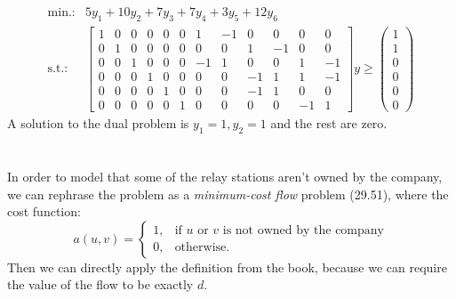 \documentclass{article}
\begin{document}
\[
\begin{array}{cl}
\textrm{min.:} & 5y_1 + 10y_2 + 7y_3 + 7y_4 + 3y_5 + 12y_6\\
\textrm{s.t.:} &
 \begin{bmatrix}%
 1 & 0 & 0 & 0 & 0 & 0 & 1 & -1 & 0 & 0 & 0 & 0\\
 0 & 1 & 0 & 0 & 0 & 0 & 0 & 0 & 1 & -1 & 0 & 0\\
 0 & 0 & 1 & 0 & 0 & 0 & -1 & 1 & 0 & 0 & 1 & -1\\
 0 & 0 & 0 & 1 & 0 & 0 & 0 & 0 & -1 & 1 & 1 & -1\\
 0 & 0 & 0 & 0 & 1 & 0 & 0 & 0 & -1 & 1 & 0 & 0\\
 0 & 0 & 0 & 0 & 0 & 1 & 0 & 0 & 0 & 0 & -1 & 1
\end{bmatrix}y
\geq
\begin{pmatrix}
  1\\ 1\\ 0\\ 0\\ 0\\ 0
\end{pmatrix}
\end{array}
\]
A solution to the dual problem is $y_1 = 1, y_2 = 1$ and the rest are
zero.

\section*{\hfill}


In order to model that some of the relay stations aren't owned by
the company, we can rephrase the problem as a \emph{minimum-cost flow}
problem (29.51), where the cost function:
\[
a(u,v) = \left\{\begin{array}{ll}1,&\text{if $u$ or $v$ is not owned
  by the company}\\ 0,&\text{otherwise.}\end{array}\right.
\]
Then we can directly apply the definition from the book, because we
can require the value of the flow to be exactly $d$.
\end{document}

